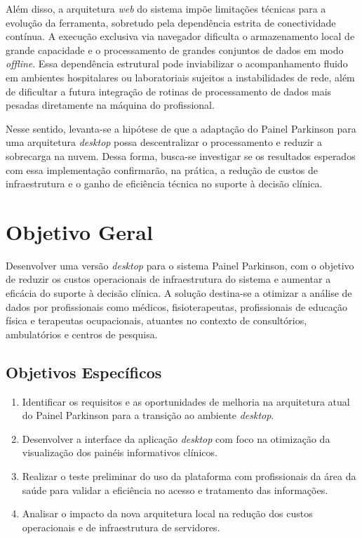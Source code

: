 Além disso, a arquitetura \textit{web} do sistema impõe limitações técnicas para a evolução da ferramenta, sobretudo pela dependência estrita de conectividade contínua. A execução exclusiva via navegador dificulta o armazenamento local de grande capacidade e o processamento de grandes conjuntos de dados em modo \textit{offline}. Essa dependência estrutural pode inviabilizar o acompanhamento fluido em ambientes hospitalares ou laboratoriais sujeitos a instabilidades de rede, além de dificultar a futura integração de rotinas de processamento de dados mais pesadas diretamente na máquina do profissional.

Nesse sentido, levanta-se a hipótese de que a adaptação do Painel Parkinson para uma arquitetura \textit{desktop} possa descentralizar o processamento e reduzir a sobrecarga na nuvem. Dessa forma, busca-se investigar se os resultados esperados com essa implementação confirmarão, na prática, a redução de custos de infraestrutura e o ganho de eficiência técnica no suporte à decisão clínica.
  

\section{Objetivo Geral}
\label{sec:Objetivo Geral}

Desenvolver uma versão \textit{desktop} para o sistema Painel Parkinson, com o objetivo de reduzir os custos operacionais de infraestrutura do sistema e aumentar a eficácia do suporte à decisão clínica. A solução destina-se a otimizar a análise de dados por profissionais como médicos, fisioterapeutas, profissionais de educação física e terapeutas ocupacionais, atuantes no contexto de consultórios, ambulatórios e centros de pesquisa.

\subsection{Objetivos Específicos}
\label{sec:Objetivos Específicos}

\begin{enumerate}
    \item Identificar os requisitos e as oportunidades de melhoria na arquitetura atual do Painel Parkinson para a transição ao ambiente \textit{desktop}.
    \item Desenvolver a interface da aplicação \textit{desktop} com foco na otimização da visualização dos painéis informativos clínicos.
    \item Realizar o teste preliminar do uso da plataforma com profissionais da área da saúde para validar a eficiência no acesso e tratamento das informações.
    \item Analisar o impacto da nova arquitetura local na redução dos custos operacionais e de infraestrutura de servidores.
\end{enumerate}

